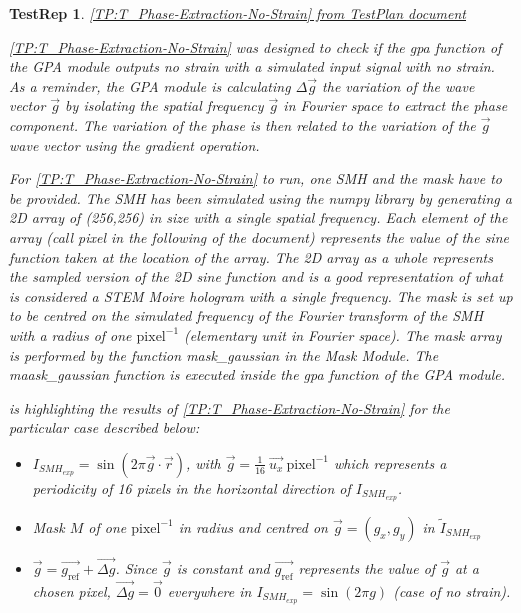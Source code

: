 \documentclass[12pt, titlepage]{article}
\newtheorem{TestRep}{TestRep}
\begin{document}
\begin{TestRep}\normalfont\underline{{\cref{TP:T_Phase-Extraction-No-Strain} from TestPlan document}} \label{Test_Report_2} \newline

\cref{TP:T_Phase-Extraction-No-Strain} was designed to check if the gpa function of the GPA module outputs no strain with a simulated input signal with no strain. As a reminder, the GPA module is calculating $\Delta \overrightarrow{g}$ the variation of the wave vector $\overrightarrow{g}$ by isolating the spatial frequency $\overrightarrow{g}$ in Fourier space to extract the phase component. The variation of the phase is then related to the variation of the $\overrightarrow{g}$ wave vector using the gradient operation. \medskip

For \cref{TP:T_Phase-Extraction-No-Strain} to run, one SMH and the mask have to be provided. The SMH has been simulated using the numpy library by generating a 2D array of (256,256) in size with a single spatial frequency. Each element of the array (call pixel in the following of the document) represents the value of the sine function taken at the location of the array. The 2D array as a whole represents the sampled version of the 2D sine function and is a good representation of what is considered a STEM Moire hologram with a single frequency. The mask is set up to be centred on the simulated frequency of the Fourier transform of the SMH with a radius of one $\text{pixel}^{-1}$ (elementary unit in Fourier space). The mask array is performed by the function mask{\_}gaussian in the Mask Module. The maask{\_}gaussian function is executed inside the gpa function of the GPA module. \medskip

 is highlighting the results of \cref{TP:T_Phase-Extraction-No-Strain} for the particular case described below:
\begin{itemize}
\item $I_{SMH_{exp}}=\sin{(2\pi \overrightarrow{g}\cdot\overrightarrow{r})}$, with $\overrightarrow{g} = \frac{1}{16} \ \overrightarrow{u_x} \ \text{pixel}^{-1}$ which represents a periodicity of 16 pixels in the horizontal direction of $I_{SMH_{exp}}$. 
\item Mask $M$ of one $\text{pixel}^{-1}$ in radius and centred on $\overrightarrow{g}=(g_x,g_y)$ in $\widetilde{I}_{SMH_{exp}}$
\item $\overrightarrow{g} = \overrightarrow{g_\text{ref}} + \overrightarrow{\Delta g}$. Since $\overrightarrow{g}$ is constant and $\overrightarrow{g_\text{ref}}$ represents the value of $\overrightarrow{g}$ at a chosen pixel, $\overrightarrow{\Delta g} = \overrightarrow{0}$ everywhere in $I_{SMH_{exp}}=\sin{(2\pi g)}$ (case of no strain).
\end{itemize}


\end{TestRep}
\end{document}
